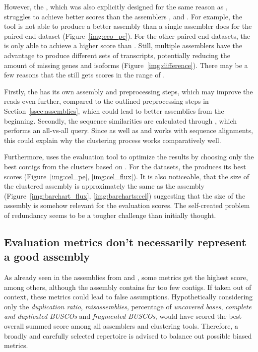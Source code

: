 \documentclass[12pt,a4paper,english]{article}
\begin{document}
		However, the \orp, which was also explicitly designed for the same reason as \karma,  struggles to achieve better scores than the assemblers \soap, \spades and \trinity. 
		For example, the tool is not able to produce a better assembly than a single assembler does for the paired-end \ecoli dataset (Figure~\ref{img:eco_pe}). For the other paired-end \celegans datasets, the \orp is only able to achieve a higher score than \soap. 
		Still, multiple assemblers have the advantage to produce different sets of transcripts, potentially reducing the amount of missing genes and isoforms (Figure~\ref{img:difference}).
		There may be a few reasons that the \orp still gets scores in the range of \cdhit. 

		
		Firstly, the \orp has its own assembly and preprocessing steps, which may improve the reads even further, compared to the outlined preprocessing steps in Section~\ref{ssec:assemblies}, which could lead to better assemblies from the beginning.
		Secondly, the sequence similarities are calculated through \orthofinder \citep{OrthoFinder:15}, which performs an all-vs-all \blast \citep{blast:90} query.
		Since \blast as well as \cdhit and \linclust works with sequence alignments, this could explain why the clustering process works comparatively well.
		
		Furthermore, \citeauthor{OysterRiverProtocol:18} uses the evaluation tool \transrate to optimize the results by choosing only the best contigs from the clusters based on \transrate.
		For the \celegans datasets, the \orp produces its best scores (Figure~\ref{img:cel_pe}, \ref{img:cel_flux}). It is also noticeable, that the size of the clustered assembly is approximately the same as the \cdhit assembly (Figure~\ref{img:barchart_flux}, \ref{img:barcharts:cel}) suggesting that the size of the assembly is somehow relevant for the evaluation scores.
		The self-created problem of redundancy seems to be a tougher challenge than initially thought.
	
	\subsection{Evaluation metrics don't necessarily represent a good assembly}
	    As already seen in the assemblies from \karma and \grouper, some metrics get the highest score, among others, although the assembly contains far too few contigs.
		If taken out of context, these metrics could lead to false assumptions. Hypothetically considering only the \textit{duplication ratio}, \textit{misassemblies}, percentage of \textit{uncovered bases}, \textit{complete and duplicated BUSCOs} and \textit{fragmented BUSCOs}, \grouper would have scored the best overall summed score among all assemblers and clustering tools.
		Therefore, a broadly and carefully selected repertoire is advised to balance out possible biased metrics.
	
\end{document}
